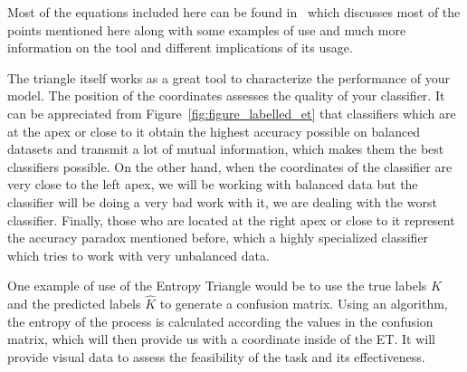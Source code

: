 Most of the equations included here can be found in~\cite{val:pel:18c} which discusses most of the points mentioned here along with some examples of use and much more information on the tool and different implications of its usage. %

The triangle itself works as a great tool to characterize the performance of your model. The position of the coordinates assesses the quality of your classifier. It can be appreciated from Figure~\ref{fig:figure_labelled_et} that classifiers which are at the apex or close to it obtain the highest accuracy possible on balanced datasets and transmit a lot of mutual information, which makes them the best classifiers possible. On the other hand, when the coordinates of the classifier are very close to the left apex, we will be working with balanced data but the classifier will be doing a very bad work with it, we are dealing with the worst classifier. Finally, those who are located at the right apex or close to it represent the accuracy paradox mentioned before, which a highly specialized classifier which tries to work with very unbalanced data. %

One example of use of the Entropy Triangle would be to use the true labels $K$ and the predicted labels $\hat{K}$ to generate a confusion matrix. Using an algorithm, the entropy of the process is calculated according the values in the confusion matrix, which will then provide us with a coordinate inside of the ET. It will provide visual data to assess the feasibility of the task and its effectiveness. %




